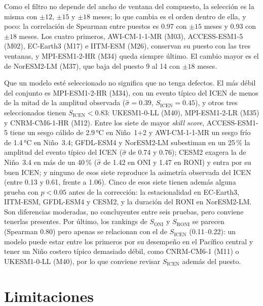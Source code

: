 \documentclass[11pt,a4paper]{article}
\begin{document}
Como el filtro no depende del ancho de ventana del compuesto, la selección es la misma con $\pm12$, $\pm15$ y $\pm18$ meses; lo que cambia es el orden dentro de ella, y poco: la correlación de Spearman entre puestos es 0.97 con $\pm15$ meses y 0.93 con $\pm18$ meses. Los cuatro primeros, AWI-CM-1-1-MR (M03), ACCESS-ESM1-5 (M02), EC-Earth3 (M17) e IITM-ESM (M26), conservan su puesto con las tres ventanas, y MPI-ESM1-2-HR (M34) queda siempre último. El cambio mayor es el de NorESM2-LM (M37), que baja del puesto 9 al 14 con $\pm18$ meses.

Que un modelo esté seleccionado no significa que no tenga defectos. El más débil del conjunto es MPI-ESM1-2-HR (M34), con un evento típico del ICEN de menos de la mitad de la amplitud observada ($\hat\sigma = 0.39$, $S_{\mathrm{ICEN}} = 0.45$), y otros tres seleccionados tienen $S_{\mathrm{ICEN}} < 0.83$: UKESM1-0-LL (M40), MPI-ESM1-2-LR (M35) y CNRM-CM6-1-HR (M12). Entre los siete de mayor \emph{skill score}, ACCESS-ESM1-5 tiene un sesgo cálido de 2.9\,°C en Niño~1+2 y AWI-CM-1-1-MR un sesgo frío de 1.4\,°C en Niño~3.4; GFDL-ESM4 y NorESM2-LM subestiman en un 25\,\% la amplitud del evento típico del ICEN ($\hat\sigma$ de 0.74 y 0.76); CESM2 exagera la de Niño~3.4 en más de un 40\,\% ($\hat\sigma$ de 1.42 en ONI y 1.47 en RONI) y entra por su buen ICEN; y ninguno de esos siete reproduce la asimetría observada del ICEN (entre 0.13 y 0.61, frente a 1.06). Cinco de esos siete tienen además alguna prueba con $p < 0.05$ antes de la corrección: la estacionalidad en EC-Earth3, IITM-ESM, GFDL-ESM4 y CESM2, y la duración del RONI en NorESM2-LM. Son diferencias moderadas, no concluyentes entre seis pruebas, pero conviene tenerlas presentes. Por último, los rankings de $S_{\mathrm{ONI}}$ y $S_{\mathrm{RONI}}$ se parecen (Spearman 0.80) pero apenas se relacionan con el de $S_{\mathrm{ICEN}}$ (0.11--0.22): un modelo puede estar entre los primeros por su desempeño en el Pacífico central y tener un Niño costero típico demasiado débil, como CNRM-CM6-1 (M11) o UKESM1-0-LL (M40), por lo que conviene revisar $S_{\mathrm{ICEN}}$ además del puesto.

\section{Limitaciones}
\label{sec:limitaciones}
\end{document}
